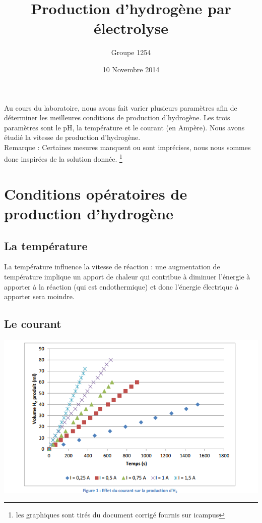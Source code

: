 \documentclass[10pt,a4paper]{article}
\title{Production d'hydrogène par électrolyse}
\author{Groupe 1254}
\date{10 Novembre 2014}
\begin{document}
\maketitle



Au cours du laboratoire, nous avons fait varier plusieurs paramètres afin de déterminer les meilleures conditions de production d'hydrogène. Les trois paramètres sont le pH, la température et le courant (en Ampère). Nous avons étudié la vitesse de production d'hydrogène.
\\

Remarque : Certaines mesures manquent ou sont imprécises, nous nous sommes donc inspirées de la solution donnée. \footnote{les graphiques sont tirés du document corrigé fournis sur icampus}

\section{Conditions opératoires de production d'hydrogène}

\subsection{La température}

La température influence la vitesse de réaction : une augmentation de température implique un apport de chaleur qui contribue à diminuer l'énergie à apporter à la réaction (qui est endothermique) et donc l'énergie électrique à apporter sera moindre.



\subsection{Le courant}

\includegraphics[scale=0.6]{PRODUCTIONHYDRO.png} 
\\
  
\end{document}
